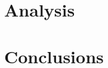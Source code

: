 \documentclass[12pt]{article}  %
\begin{document}
\section{Analysis} %
\section{Conclusions} %
\clearpage %
\end{document}
